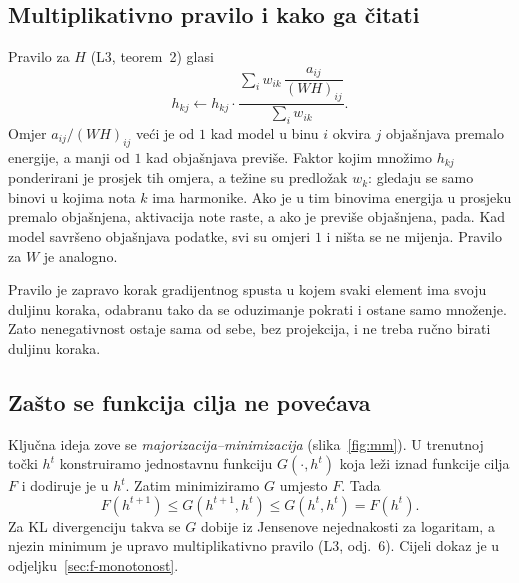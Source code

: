 \documentclass[11pt,a4paper]{article}
\theoremstyle{definition}
\theoremstyle{plain}
\theoremstyle{remark}
\begin{document}
\subsection{Multiplikativno pravilo i kako ga čitati}

Pravilo za $H$ (L3, teorem~2) glasi
\[
  h_{kj} \leftarrow h_{kj}\cdot
  \frac{\sum_i w_{ik}\,\dfrac{a_{ij}}{(WH)_{ij}}}{\sum_i w_{ik}} .
\]
Omjer $a_{ij}/(WH)_{ij}$ veći je od $1$ kad model u binu $i$ okvira $j$ objašnjava premalo
energije, a manji od $1$ kad objašnjava previše. Faktor kojim množimo $h_{kj}$ ponderirani je
prosjek tih omjera, a težine su predložak $w_k$: gledaju se samo binovi u kojima nota $k$ ima
harmonike. Ako je u tim binovima energija u prosjeku premalo objašnjena, aktivacija note raste, a
ako je previše objašnjena, pada. Kad model savršeno objašnjava podatke, svi su omjeri $1$ i ništa
se ne mijenja. Pravilo za $W$ je analogno.

Pravilo je zapravo korak gradijentnog spusta u kojem svaki element ima svoju duljinu koraka,
odabranu tako da se oduzimanje pokrati i ostane samo množenje. Zato nenegativnost ostaje sama od
sebe, bez projekcija, i ne treba ručno birati duljinu koraka.

\subsection{Zašto se funkcija cilja ne povećava}

Ključna ideja zove se \emph{majorizacija–minimizacija} (slika~\ref{fig:mm}). U trenutnoj točki
$h^t$ konstruiramo jednostavnu funkciju $G(\cdot,h^t)$ koja leži iznad funkcije cilja $F$ i dodiruje
je u $h^t$. Zatim minimiziramo $G$ umjesto $F$. Tada
\[
  F(h^{t+1}) \leq G(h^{t+1},h^t) \leq G(h^t,h^t) = F(h^t).
\]
Za KL divergenciju takva se $G$ dobije iz Jensenove nejednakosti za logaritam, a njezin minimum je
upravo multiplikativno pravilo (L3, odj.~6). Cijeli dokaz je u odjeljku~\ref{sec:f-monotonost}.
\end{document}
